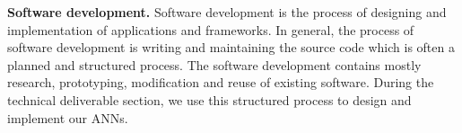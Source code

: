 \textbf{Software development.} Software development is the process of designing
and implementation of applications and frameworks. In general, the process of
software development is writing and maintaining the source code which is often a
planned and structured process. The software development contains mostly
research, prototyping, modification and reuse of existing software. During the
technical deliverable section, we use this structured process to design and
implement our ANNs. 
